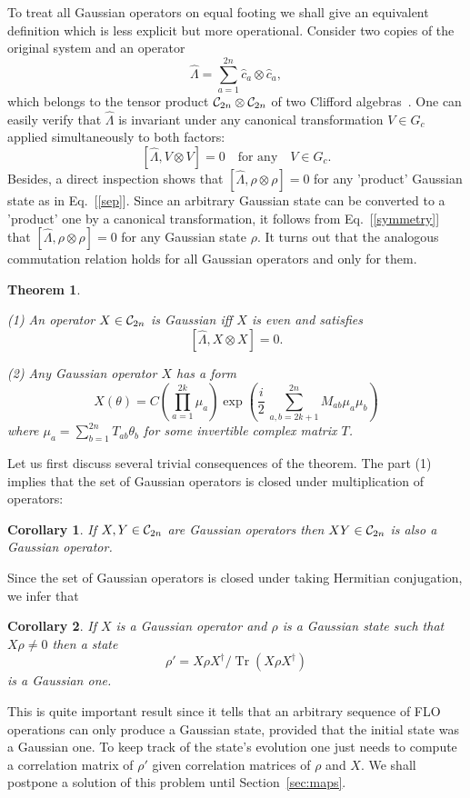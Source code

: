 \documentclass[twocolumn,showpacs,preprintnumbers,superscriptaddress]{revtex4}
\newtheorem{theorem}{Theorem}
\newtheorem{cor}{Corollary}
\newcommand{\Clif}{{\cal C}}
\newcommand{\be}{\begin{equation}}
\newcommand{\ee}{\end{equation}}
\newcommand{\cop}{{\hat{c}}}
\newcommand{\Lop}{{\hat{\Lambda}}}
\DeclareMathOperator*{\tr}{\mathop{\mathrm{Tr}}}
\begin{document}
To treat all Gaussian operators on equal footing we shall give an equivalent 
definition which is less explicit but more operational. 
Consider two copies of the original system and an operator
\be\label{Lambda}
\Lop=\sum_{a=1}^{2n} \cop_a\otimes \cop_a,
\ee
which belongs to the tensor product $\Clif_{2n}\otimes \Clif_{2n}$ of two
Clifford algebras~\cite{comment1}. One can easily verify that
$\Lop$ is invariant under any canonical transformation $V\in G_c$ applied
simultaneously to both factors:
\be\label{symmetry}
[\Lop, V\otimes V]=0 \quad \mbox{for any} \quad V\in G_c.
\ee
Besides, a direct inspection shows that $[\Lop,\rho\otimes\rho]=0$
for any 'product' Gaussian state as in Eq.~[\ref{sep}]. 
Since an arbitrary Gaussian state can be converted to a 'product' one 
by a canonical transformation, 
it follows from Eq.~[\ref{symmetry}] that $[\Lop,\rho\otimes\rho]=0$
for any Gaussian state $\rho$.
It turns out that the analogous commutation relation holds for all
Gaussian operators and only for them.


\begin{theorem}
\label{theorem:Gopr}
${}$

\noindent
(1) An operator $X\in \Clif_{2n}$ is Gaussian iff $X$ is even and satisfies
\[
[\Lop, X\otimes X]=0.
\]

\noindent
(2) Any Gaussian operator $X$ has a form
\be\label{Gopr_canon}
X(\theta)=C\left(\prod_{a=1}^{2k} \mu_a\right)
\exp{\left( \frac{i}2 \,
\sum_{a,b=2k+1}^{2n} M_{ab} \mu_a \mu_b 
\right) }
\ee
where $\mu_a = \sum_{b=1}^{2n} T_{ab} \theta_b$ for some invertible
complex matrix  $T$.
\end{theorem}
Let us first discuss several trivial consequences of the theorem.
The part (1) implies that the set of Gaussian operators
is closed under multiplication of operators:
\begin{cor}
If $X,Y \in \Clif_{2n}$ are Gaussian operators then $XY\in \Clif_{2n}$ is 
also a Gaussian operator.
\end{cor}
Since the set of Gaussian operators is closed under taking Hermitian conjugation, 
we infer that 
\begin{cor}
If $X$ is a Gaussian operator and $\rho$ is a Gaussian state
such that $X\rho\ne 0$ then   a state 
\[
\rho' = X\rho X^\dag/ \tr(X\rho X^\dag)
\]
is a Gaussian one. 
\end{cor}
This is quite important result since it tells that an arbitrary
sequence of FLO operations can only produce a Gaussian state,
provided that the initial state was a Gaussian one.
To keep track of the state's evolution one just needs to 
compute a correlation matrix of $\rho'$ given correlation
matrices of $\rho$ and $X$. We shall postpone a solution of this problem
until Section~\ref{sec:maps}.
\end{document}
